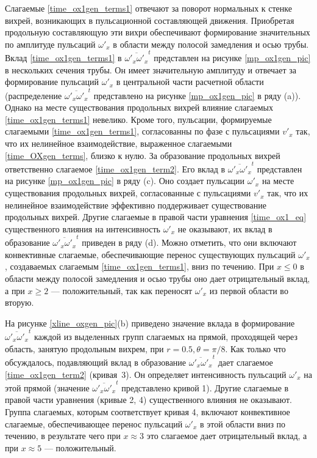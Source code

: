 Слагаемые \eqref{time_ox1gen_terms1} отвечают за поворот нормальных к стенке вихрей, возникающих в пульсационной составляющей движения. Приобретая продольную составляющую эти вихри обеспечивают формирование значительных по амплитуде пульсаций $\omega'_x$ в области между полосой замедления и осью трубы. Вклад \eqref{time_ox1gen_terms1} в $\overline{\omega'_x \omega'_x}^t$ представлен на рисунке \ref{mp_ox1gen_pic} в нескольких сечения трубы. Он имеет значительную амплитуду и отвечает за формирование пульсаций $\omega'_x$ в центральной части расчетной области (распределение $\overline{\omega'_x \omega'_x}^t$ представлено на рисунке \ref{mp_ox1gen_pic} в ряду (a)). Однако на месте существования продольных вихрей влияние слагаемых \eqref{time_ox1gen_terms1} невелико. Кроме того, пульсации, формируемые слагаемыми \eqref{time_ox1gen_terms1}, согласованны по фазе с пульсациями $v'_x$ так, что их нелинейное взаимодействие, выраженное слагаемыми \eqref{time_OXgen_terms}, близко к нулю. За образование продольных вихрей ответственно слагаемое \eqref{time_ox1gen_term2}. Его вклад в $\overline{\omega'_x \omega'_x}^t$ представлен на рисунке \ref{mp_ox1gen_pic} в ряду (c). Оно создает пульсации $\omega'_x$ на месте существования продольных вихрей, согласованные с пульсациями $v'_x$ так, что их нелинейное взаимодействие эффективно поддерживает существование продольных вихрей. Другие слагаемые в правой части уравнения \eqref{time_ox1_eq} существенного влияния на интенсивность $\omega'_x$ не оказывают, их вклад в образование $\overline{\omega'_x \omega'_x}^t$ приведен в ряду (d). Можно отметить, что они включают конвективные слагаемые, обеспечивающие перенос существующих пульсаций $\omega'_x$, создаваемых слагаемым \eqref{time_ox1gen_terms1}, вниз по течению. При $x \le 0$ в области между полосой замедления и осью трубы оно дает отрицательный вклад, а при $x \ge 2$ --- положительный, так как переносят $\omega'_x$ из первой области во вторую.

На рисунке \ref{xline_oxgen_pic}(b) приведено значение вклада в формирование $\overline{\omega'_x \omega'_x}^t$ каждой из выделенных групп слагаемых на прямой, проходящей через область, занятую продольным вихрем, при $r = 0.5, \theta = \pi/8$. Как только что обсуждалось, подавляющий вклад в образование $\overline{\omega'_x \omega'_x}^t$  дает слагаемое \eqref{time_ox1gen_term2} (кривая~3). Он определяет интенсивность пульсаций $\omega'_x$ на этой прямой (значение $\overline{\omega'_x \omega'_x}^t$ представлено кривой 1). Другие слагаемые в правой части уравнения (кривые 2, 4) существенного влияния не оказывают. Группа слагаемых, которым соответствует кривая 4, включают конвективное слагаемые, обеспечивающее перенос пульсаций $\omega'_x$ в этой области вниз по течению, в результате чего при $x \approx 3$ это слагаемое дает отрицательный вклад, а при $x \approx 5$ --- положительный. 

